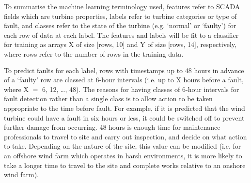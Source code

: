 To summarise the machine learning terminology used, features refer to SCADA
fields which are turbine properties, labels refer to turbine categories or
type of fault, and classes refer to the state of the turbine (e.g. `normal' or
`faulty') for each row of data at each label. The features and labels will be
fit to a classifier for training as arrays X of size [rows, 10] and Y of size
[rows, 14], respectively, where rows refer to the number of rows in the
training data.

To predict faults for each label, rows with timestamps up to 48 hours in
advance of a `faulty' row are classed at 6-hour intervals (i.e. up to X hours
before a fault, where X $=$ 6, 12, \dots, 48). The reasons for having classes
of 6-hour intervals for fault detection rather than a single class is to allow
action to be taken appropriate to the time before fault. For example, if it is
predicted that the wind turbine could have a fault in six hours or less, it
could be switched off to prevent further damage from occurring. 48 hours is
enough time for maintenance professionals to travel to site and carry out
inspection, and decide on what action to take. Depending on the nature of the
site, this value can be modified (i.e. for an offshore wind farm which
operates in harsh environments, it is more likely to take a longer time to
travel to the site and complete works relative to an onshore wind farm).

